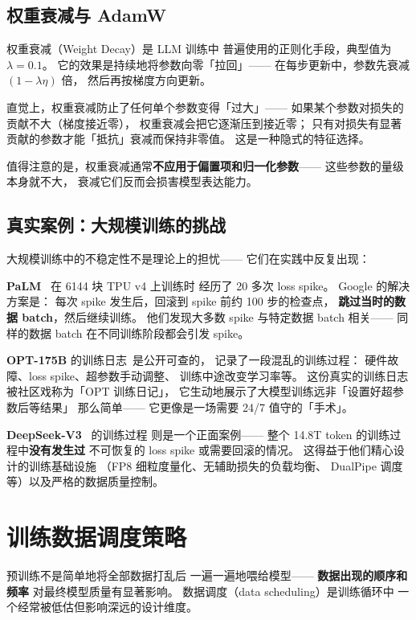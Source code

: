 \subsection{权重衰减与 AdamW}

权重衰减（Weight Decay）是 LLM 训练中
普遍使用的正则化手段，典型值为 $\lambda = 0.1$。
它的效果是持续地将参数向零「拉回」——
在每步更新中，参数先衰减 $(1 - \lambda \eta)$ 倍，
然后再按梯度方向更新。

直觉上，权重衰减防止了任何单个参数变得「过大」——
如果某个参数对损失的贡献不大（梯度接近零），
权重衰减会把它逐渐压到接近零；
只有对损失有显著贡献的参数才能「抵抗」衰减而保持非零值。
这是一种隐式的特征选择。

值得注意的是，权重衰减通常\textbf{不应用于偏置项和归一化参数}——
这些参数的量级本身就不大，
衰减它们反而会损害模型表达能力。

\subsection{真实案例：大规模训练的挑战}

大规模训练中的不稳定性不是理论上的担忧——
它们在实践中反复出现：

\textbf{PaLM}~\cite{chowdhery2022palm} 在 6144 块 TPU v4 上训练时
经历了 20 多次 loss spike。
Google 的解决方案是：
每次 spike 发生后，回滚到 spike 前约 100 步的检查点，
\textbf{跳过当时的数据 batch}，然后继续训练。
他们发现大多数 spike 与特定数据 batch 相关——
同样的数据 batch 在不同训练阶段都会引发 spike。

\textbf{OPT-175B} 的训练日志~是公开可查的，%
记录了一段混乱的训练过程：
硬件故障、loss spike、超参数手动调整、
训练中途改变学习率等。
这份真实的训练日志被社区戏称为「OPT 训练日记」，
它生动地展示了大模型训练远非「设置好超参数后等结果」
那么简单——
它更像是一场需要 24/7 值守的「手术」。

\textbf{DeepSeek-V3}~\cite{deepseekv3} 的训练过程
则是一个正面案例——
整个 14.8T token 的训练过程中\textbf{没有发生过}
不可恢复的 loss spike 或需要回滚的情况。
这得益于他们精心设计的训练基础设施
（FP8 细粒度量化、无辅助损失的负载均衡、
DualPipe 调度等）以及严格的数据质量控制。

\section{训练数据调度策略}
\label{sec:data-scheduling}

预训练不是简单地将全部数据打乱后
一遍一遍地喂给模型——
\textbf{数据出现的顺序和频率}
对最终模型质量有显著影响。
数据调度（data scheduling）是训练循环中
一个经常被低估但影响深远的设计维度。

